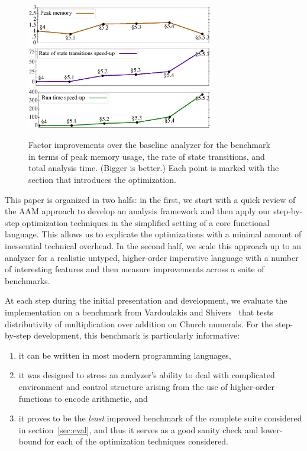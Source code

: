 \documentclass[preprint,onecolumn,9pt]{sigplanconf} %
\begin{document}
\begin{figure}[t]
\begin{center}
\includegraphics[width=3.2in]{church-relative-space.ps}
\includegraphics[width=3.2in]{church-relative-speed.ps}
\includegraphics[width=3.2in]{church-relative-time.ps}
\vspace{-1.5em}
\end{center}
\caption{Factor improvements over the baseline analyzer for the
  \Church{} benchmark in terms of peak memory usage, the rate of state
  transitions, and total analysis time. (Bigger is better.) Each point
  is marked with the section that introduces the optimization.}
\label{fig:churchtime}
\end{figure}


This paper is organized in two halfs: in the first, we start with a
quick review of the AAM approach to develop an analysis framework and
then apply our step-by-step optimization techniques in the simplified
setting of a core functional language.  This allows us to explicate
the optimizations with a minimal amount of inessential technical
overhead.  In the second half, we scale this approach up to an
analyzer for a realistic untyped, higher-order imperative language
with a number of interesting features and then measure
improvements across a suite of benchmarks.

At each step during the initial presentation and development, we evaluate the
implementation on a benchmark from Vardoulakis and
Shivers~\cite{dvanhorn:Vardoulakis2011CFA2} that tests distributivity
of multiplication over addition on Church numerals.
For the step-by-step development, 
this benchmark is particularly informative:
\begin{enumerate}
\item it can be written in most modern programming languages,
%
\item it was designed to stress an analyzer's ability to deal with
  complicated environment and control structure arising from the use
  of higher-order functions to encode arithmetic, and
%
\item it proves to be the \emph{least} improved benchmark of the
  complete suite considered in section~\ref{sec:eval}, and thus it
  serves as a good sanity check and lower-bound for each of the
  optimization techniques considered.
\end{enumerate}
\end{document}
